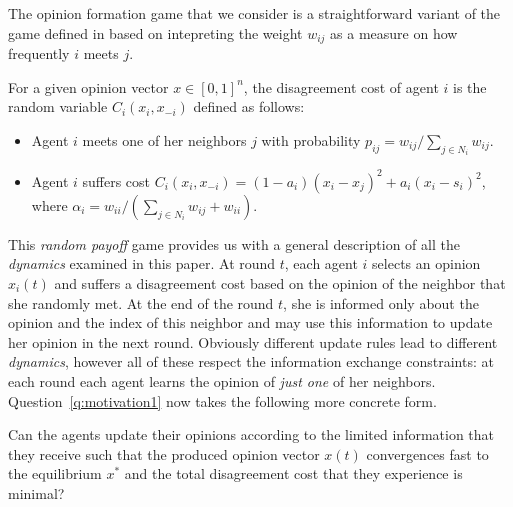 The opinion formation game that we consider is a straightforward
variant of the game defined in \cite{BKO11} based on intepreting the 
weight $w_{ij}$ as a measure on how frequently $i$ meets $j$.
\begin{definition}\label{d:random_game}
  For a given opinion vector $x \in [0,1]^n$, the disagreement cost of agent
  $i$ is the random variable $C_i(x_i,x_{-i})$ defined as follows:
  \begin{itemize}
    \item Agent $i$ meets one of her neighbors $j$ with probability $p_{ij}=
      w_{ij}/\sum_{j\in N_i}w_{ij}$.
    \item Agent $i$ suffers cost $C_i(x_i , x_{-i}) = (1-a_i)(x_i-x_j)^2 +
      a_i(x_i-s_i)^2$, where $\alpha_i = w_{ii}/(\sum_{j\in N_i}w_{ij}+w_{ii})$.
  \end{itemize}
\end{definition}
This \emph{random payoff} game provides us with a general description of all the \emph{dynamics}
examined in this paper. At round $t$, each agent $i$ selects an opinion $x_i(t)$ and suffers a
disagreement cost based on the opinion of the neighbor that she randomly met.
At the end of the round $t$, she is informed only about the opinion and the index 
of this neighbor and may use this information to update her opinion in the next round. 
Obviously different update rules lead to different \emph{dynamics}, however all of these
respect the information exchange constraints: at each round each agent learns 
the opinion of \emph{just one} of her neighbors. 
Question~\ref{q:motivation1} now takes the following more
concrete form.

\begin{question}\label{q:motivation2}
  Can the agents update their opinions according to the limited information
  that they receive such that the produced opinion vector $x(t)$ convergences
  fast to the equilibrium $x^*$ and the total disagreement cost that they
  experience is minimal?
\end{question}


